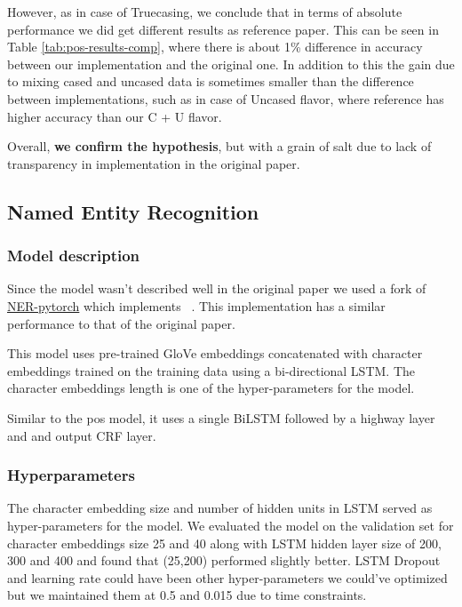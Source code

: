 \documentclass[11pt,a4paper]{article}
\begin{document}
    However, as in case of Truecasing, we conclude that in terms of absolute performance we did get different results as reference paper. This can be seen in Table \ref{tab:pos-results-comp}, where there is about 1\% difference in accuracy between our implementation and the original one. In addition to this the gain due to mixing cased and uncased data is sometimes smaller than the difference between implementations, such as in case of Uncased flavor, where reference has higher accuracy than our C + U flavor.

    Overall, \textbf{we confirm the hypothesis}, but with a grain of salt due to lack of transparency in implementation in the original paper.


\subsection{Named Entity Recognition}
\label{sec:exp-ner}

    \subsubsection{Model description}
    Since the model wasn't described well in the original paper we used a fork of \href{https://github.com/ZhixiuYe/NER-pytorch}{NER-pytorch} which implements ~\cite{DBLP:journals/corr/LampleBSKD16}. This implementation has a similar performance to that of the original paper.

    This model uses pre-trained GloVe embeddings concatenated with character embeddings trained on the training data using a bi-directional LSTM. The character embeddings length is one of the hyper-parameters for the model.

    Similar to the pos model, it uses a single BiLSTM followed by a highway layer and and output CRF layer.

    \subsubsection{Hyperparameters}
    The character embedding size and number of hidden units in LSTM served as hyper-parameters for the model. We evaluated the model on the validation set for character embeddings size 25 and 40 along with LSTM hidden layer size of 200, 300 and 400 and found that (25,200) performed slightly better. LSTM Dropout and learning rate could have been other hyper-parameters we could've optimized but we maintained them at  0.5 and 0.015 due to time constraints.
\end{document}
